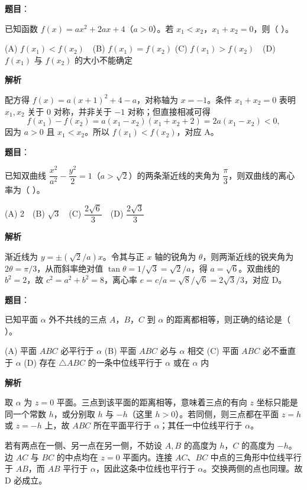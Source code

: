 \begin{answer}

\textbf{题目}：

已知函数 \(f(x)=ax^2+2ax+4\)（\(a>0\)）。若 $x_1<x_2\text{，}x_1+x_2=0$，则（ ）。

(A) \(f(x_1)<f(x_2)\)　(B) \(f(x_1)=f(x_2)\)
(C) \(f(x_1)>f(x_2)\)　(D) \(f(x_1)\) 与 \(f(x_2)\) 的大小不能确定

\textbf{解析}

配方得 $f(x)=a(x+1)^2+4-a$，对称轴为 $x=-1$。条件 $x_1+x_2=0$ 表明 $x_1,x_2$ 关于 $0$ 对称，并非关于 $-1$ 对称；但直接相减可得
\nopagebreak[4]
\[
f(x_1)-f(x_2)=a(x_1-x_2)(x_1+x_2+2)=2a(x_1-x_2)<0,
\]
因为 $a>0$ 且 $x_1<x_2$。所以 $f(x_1)<f(x_2)$，对应 A。


\end{answer}
\begin{answer}

\textbf{题目}：

已知双曲线 \(\dfrac{x^2}{a^2}-\dfrac{y^2}{2}=1\)（\(a>\sqrt2\)）的两条渐近线的夹角为 \(\dfrac\pi3\)，则双曲线的离心率为（ ）。

(A) 2　(B) \(\sqrt3\)　(C) \(\dfrac{2\sqrt6}{3}\)　(D) \(\dfrac{2\sqrt3}{3}\)

\textbf{解析}

渐近线为 $y=\pm(\sqrt2/a)x$。令其与正 $x$ 轴的锐角为 $\theta$，则两渐近线的锐夹角为 $2\theta=\pi/3$，从而斜率绝对值 $\tan\theta=1/\sqrt3=\sqrt2/a$，得 $a=\sqrt6$。双曲线的 $b^2=2$，故 $c^2=a^2+b^2=8$，离心率 $e=c/a=\sqrt8/\sqrt6=2\sqrt3/3$，对应 D。


\end{answer}
\begin{answer}

\textbf{题目}：

已知平面 \(\alpha\) 外不共线的三点 $A\text{，}B\text{，}C$ 到 \(\alpha\) 的距离都相等，则正确的结论是（ ）。

(A) 平面 \(ABC\) 必平行于 \(\alpha\)
(B) 平面 \(ABC\) 必与 \(\alpha\) 相交
(C) 平面 \(ABC\) 必不垂直于 \(\alpha\)
(D) 存在 \(\triangle ABC\) 的一条中位线平行于 \(\alpha\) 或在 \(\alpha\) 内

\textbf{解析}

取 $\alpha$ 为 $z=0$ 平面。三点到该平面的距离相等，意味着三点的有向 $z$ 坐标只能是同一个常数 $h$，或分别取 $h$ 与 $-h$（这里 $h>0$）。若同侧，则三点都在平面 $z=h$ 或 $z=-h$ 上，故 $ABC$ 所在平面平行于 $\alpha$；其任一中位线平行于 $\alpha$。

若有两点在一侧、另一点在另一侧，不妨设 $A,B$ 的高度为 $h$，$C$ 的高度为 $-h$。边 $AC$ 与 $BC$ 的中点均在 $z=0$ 平面内。连接 $AC$、$BC$ 中点的三角形中位线平行于 $AB$，而 $AB$ 平行于 $\alpha$，因此这条中位线也平行于 $\alpha$。交换两侧的点也同理。故 D 必成立。


\end{answer}

